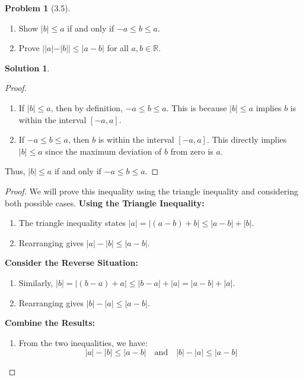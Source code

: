 \documentclass[12pt]{article}
\theoremstyle{definition} %
\newtheorem{solution}{Solution}
\newtheorem{problem}{Problem}
\theoremstyle{plain} %
\begin{document}
\begin{problem}[3.5]
    \begin{enumerate}
        \item Show $|b|\leq a$ if and only if $-a\leq b\leq a$.
        \item Prove $||a|-|b||\leq|a-b|$ for all $a,b \in \mathbb{R}$.
    \end{enumerate}
\end{problem}

\begin{solution}
 \begin{proof}
        \begin{enumerate}
            \item If $|b| \leq a$, then by definition, $-a \leq b \leq a$. This is because $|b| \leq a$ implies $b$ is within the interval $[-a, a]$.
            \item If $-a \leq b \leq a$, then $b$ is within the interval $[-a, a]$. This directly implies $|b| \leq a$ since the maximum deviation of $b$ from zero is $a$.
        \end{enumerate}
        Thus, $|b| \leq a$ if and only if $-a \leq b \leq a$. 
    \end{proof}
    \begin{proof}
        We will prove this inequality using the triangle inequality and considering both possible cases.
  \textbf{Using the Triangle Inequality:}
            \begin{enumerate}
                \item The triangle inequality states $|a| = |(a - b) + b| \leq |a - b| + |b|$.
                \item Rearranging gives $|a| - |b| \leq |a - b|$.
            \end{enumerate}
            
          \textbf{Consider the Reverse Situation:}
            \begin{enumerate}
                \item Similarly, $|b| = |(b - a) + a| \leq |b - a| + |a| = |a - b| + |a|$.
                \item Rearranging gives $|b| - |a| \leq |a - b|$.
            \end{enumerate}
            
             \textbf{Combine the Results:}
            \begin{enumerate}
                \item From the two inequalities, we have:
                $$
                |a| - |b| \leq |a - b| \quad \text{and} \quad |b| - |a| \leq |a - b|
                $$
            \end{enumerate}
            

\end{proof}
\end{solution}
\end{document}
